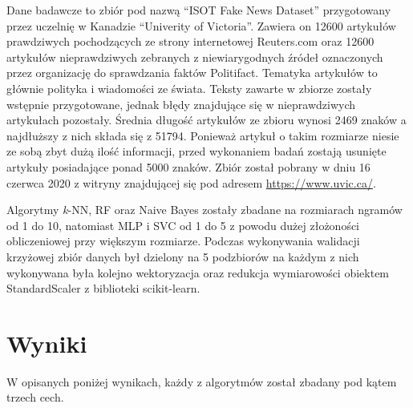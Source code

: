 Dane badawcze to zbiór pod nazwą ``ISOT Fake News Dataset'' przygotowany przez uczelnię w 
Kanadzie ``Univerity of Victoria''. Zawiera on 12600 artykułów prawdziwych pochodzących ze strony
internetowej Reuters.com oraz 12600 artykułów nieprawdziwych zebranych z niewiarygodnych źródeł
oznaczonych przez organizację do sprawdzania faktów Politifact. Tematyka artykułów to głównie polityka i wiadomości 
ze świata. Teksty zawarte w zbiorze zostały wstępnie przygotowane, jednak błędy znajdujące się w nieprawdziwych 
artykułach pozostały. Średnia długość artykułów ze zbioru wynosi 2469 znaków a najdłuższy z nich składa się z 51794.
Ponieważ artykuł o takim rozmiarze niesie ze sobą zbyt dużą ilość informacji, przed wykonaniem badań zostają usunięte 
artykuły posiadające ponad 5000 znaków. Zbiór został pobrany w dniu 16 czerwca 2020 z witryny znajdującej się 
pod adresem \url{https://www.uvic.ca/}.~\cite{ISOT}

Algorytmy \textit{k}-NN, RF oraz Naive Bayes zostały zbadane na rozmiarach ngramów od 1 do 10, natomiast
MLP i SVC od 1 do 5 z powodu dużej złożoności obliczeniowej przy większym rozmiarze. Podczas 
wykonywania walidacji krzyżowej zbiór danych był dzielony na 5 podzbiorów na każdym z nich wykonywana była kolejno 
wektoryzacja oraz redukcja wymiarowości obiektem StandardScaler z biblioteki scikit-learn.
\section{Wyniki}
W opisanych poniżej wynikach, każdy z algorytmów został zbadany pod kątem trzech cech. 
\begin{table}[H]
    \centering
    \caption{Wyniki algorytmu \textit{k}-NN wektoryzacja metodą Bag of words}
\end{table}

